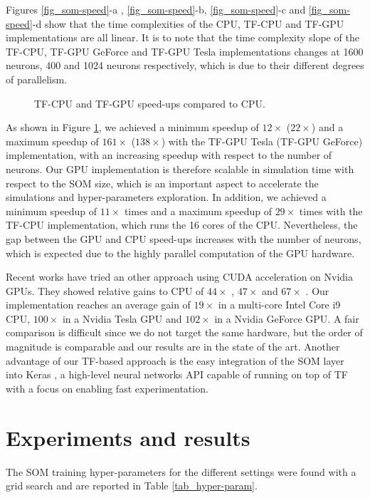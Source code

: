 \documentclass[runningheads]{llncs}
\begin{document}
Figures \ref{fig_som-speed}-a , \ref{fig_som-speed}-b, \ref{fig_som-speed}-c and \ref{fig_som-speed}-d show that the time complexities of the CPU, TF-CPU and TF-GPU implementations are all linear. It is to note that the time complexity slope of the TF-CPU, TF-GPU GeForce and TF-GPU Tesla implementations changes at 1600 neurons, 400 and 1024 neurons respectively, which is due to their different degrees of parallelism.

\begin{figure}[ht]
	\centerline{}
	\caption{TF-CPU and TF-GPU speed-ups compared to CPU.}
	\label{fig_som-speedup}
\end{figure}

As shown in Figure \ref{fig_som-speedup}, we achieved a minimum speedup of $12\times$ ($22\times$) and a maximum speedup of $161\times$ ($138\times$) with the TF-GPU Tesla (TF-GPU GeForce) implementation, with an increasing speedup with respect to the number of neurons. Our GPU implementation is therefore scalable in simulation time with respect to the SOM size, which is an important aspect to accelerate the simulations and hyper-parameters exploration. 
In addition, we achieved a minimum speedup of $11\times$ times and a maximum speedup of $29\times$ times with the TF-CPU implementation, which runs the 16 cores of the CPU. Nevertheless, the gap between the GPU and CPU speed-ups increases with the number of neurons, which is expected due to the highly parallel computation of the GPU hardware.

Recent works have tried an other approach using CUDA acceleration on Nvidia GPUs. They showed relative gains to CPU of $44\times$ \cite{moraes2012som_cuda}, $47\times$ \cite{gavval2019som_cuda} and $67\times$ \cite{mcconnell2012som_opencl_cuda}. Our implementation reaches an average gain of $19\times$ in a multi-core Intel Core i9 CPU, $100\times$ in a Nvidia Tesla GPU and $102\times$ in a Nvidia GeForce GPU. A fair comparison is difficult since we do not target the same hardware, but the order of magnitude is comparable and our results are in the state of the art.
Another advantage of our TF-based approach is the easy integration of the SOM layer into Keras \cite{chollet2015keras}, a high-level neural networks API capable of running on top of TF with a focus on enabling fast experimentation.



\section{Experiments and results}
\label{sec_results}
The SOM training hyper-parameters for the different settings were found with a grid search and are reported in Table \ref{tab_hyper-param}.
\end{document}
